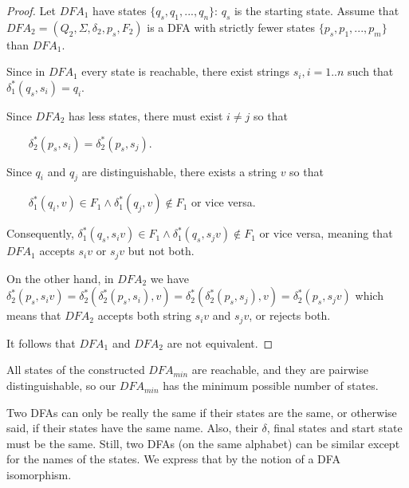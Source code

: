 \begin{proof}
Let $DFA_1$ have states $\{q_s,q_1,...,q_n\}$: $q_s$ is the starting
state. Assume that
%
$DFA_2 = (Q_2,\Sigma,\delta_2,p_s,F_2)$ is a DFA with strictly fewer
states $\{p_s,p_1,...,p_m\}$ than $DFA_1$.

Since in $DFA_1$ every state is reachable, there exist strings $s_i,
i=1..n$ such that
%
$\delta_1^*(q_s,s_i) = q_i$.


Since $DFA_2$ has less states, there must exist $i \neq j$ so that

$~~~~~~~~~\delta_2^*(p_s,s_i) = \delta_2^*(p_s,s_j)$.


Since $q_i$ and $q_j$ are distinguishable, there exists a string $v$
so that


$~~~~~~~~~\delta_1^*(q_i,v) \in F_1 \wedge \delta_1^*(q_j,v) \notin F_1$ or vice versa.

Consequently,
%
$\delta_1^*(q_s,s_iv) \in F_1 \wedge \delta_1^*(q_s,s_jv) \notin F_1$
or vice versa, meaning that $DFA_1$ accepts $s_iv$ or $s_jv$ but not
both.


On the other hand, in $DFA_2$ we have
$\delta_2^*(p_s,s_iv) = \delta_2^*(\delta_2^*(p_s,s_i),v) =
\delta_2^*(\delta_2^*(p_s,s_j),v) = \delta_2^*(p_s,s_jv)$
which means that $DFA_2$ accepts both string $s_iv$ and $s_jv$,
or rejects both.

It follows that $DFA_1$ and $DFA_2$ are not equivalent.
\end{proof}

All states of the constructed $DFA_{min}$ are reachable, and they are
pairwise distinguishable, so our $DFA_{min}$ has the minimum possible
number of states.


Two DFAs can only be really the same if their states are the same, or
otherwise said, if their states have the same name. Also, their
$\delta$, final states and start state must be the same. Still, two
DFAs (on the same alphabet) can be similar except for the names of the
states. We express that by the notion of a DFA isomorphism.

